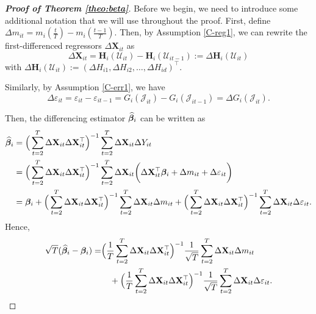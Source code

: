 \begin{proof}[\textnormal{\textbf{Proof of Theorem \ref{theo:beta}}}]


Before we begin, we need to introduce some additional notation that we will use throughout the proof. First, define $\Delta m_{it} = m_i \left( \frac{t}{T} \right) - m_i \left(\frac{t-1}{T}\right)$. Then, by Assumption \ref{C-reg1}, we can rewrite the first-differenced regressors $\Delta  \mathbf{X}_{it}$ as
\[ \Delta \mathbf{X}_{it} =\mathbf{H}_i(\mathcal{U}_{it}) - \mathbf{H}_i(\mathcal{U}_{it-1}) := \Delta \mathbf{H}_i(\mathcal{U}_{it}) \]
with $\Delta \mathbf{H}_i(\mathcal{U}_{it}) := (\Delta H_{i1}, \Delta H_{i2}, \ldots, \Delta H_{id})^\top$.

Similarly, by Assumption \ref{C-err1}, we have
\[\Delta \varepsilon_{it} = \varepsilon_{it} - \varepsilon_{it-1} = G_i(\mathcal{J}_{it}) - G_i(\mathcal{J}_{it-1}) = \Delta G_i(\mathcal{J}_{it}).
\]

Then, the differencing estimator $\widehat{\bm{\beta}}_i$ can be written as
\begin{align*}
\widehat{\bm{\beta}}_i &= \Big( \sum_{t=2}^T \Delta \mathbf{X}_{it} \Delta \mathbf{X}_{it}^\top \Big)^{-1} \sum_{t=2}^T \Delta \mathbf{X}_{it} \Delta Y_{it} \\
& =  \Big( \sum_{t=2}^T \Delta \mathbf{X}_{it} \Delta \mathbf{X}_{it}^\top \Big)^{-1} \sum_{t=2}^T \Delta \mathbf{X}_{it} \bigg(\Delta \mathbf{X}_{it}^\top \bm{\beta}_i +  \Delta m_{it}+ \Delta \varepsilon_{it} \bigg) \\
&= \bm{\beta}_i +   \Big( \sum_{t=2}^T \Delta \mathbf{X}_{it} \Delta \mathbf{X}_{it}^\top \Big)^{-1} \sum_{t=2}^T \Delta \mathbf{X}_{it} \Delta m_{it} +  \Big( \sum_{t=2}^T \Delta \mathbf{X}_{it} \Delta \mathbf{X}_{it}^\top \Big)^{-1} \sum_{t=2}^T \Delta \mathbf{X}_{it} \Delta \varepsilon_{it}. 
\end{align*}
Hence,
\begin{align}\label{theo:beta:proof1}
\begin{split}
 \sqrt{T}( \widehat{\bm{\beta}}_i - \bm{\beta}_i) = &\Big( \frac{1}{T}\sum_{t=2}^T \Delta \mathbf{X}_{it} \Delta \mathbf{X}_{it}^\top \Big)^{-1} \frac{1}{\sqrt{T}}\sum_{t=2}^T \Delta \mathbf{X}_{it} \Delta m_{it} \\
&\quad+  \Big(\frac{1}{T} \sum_{t=2}^T \Delta \mathbf{X}_{it} \Delta \mathbf{X}_{it}^\top \Big)^{-1}\frac{1}{\sqrt{T}} \sum_{t=2}^T \Delta \mathbf{X}_{it} \Delta \varepsilon_{it}.
\end{split}
\end{align}


\end{proof}
